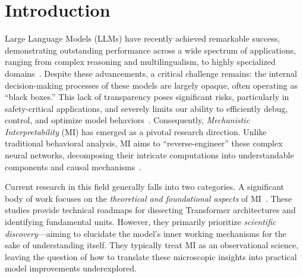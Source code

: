 \documentclass[11pt,letterpaper]{mystyle}
\begin{document}
\section{Introduction}
\label{sec:intro}
Large Language Models (LLMs) have recently achieved remarkable success, demonstrating outstanding performance across a wide spectrum of applications, ranging from complex reasoning and multilingualism, to highly specialized domains~\citep{li2025system,ren2025deepseek,dubey2024llama,openai2024gpt4technicalreport,liang2025sws,qin2025survey,yang2024llm,chang2025treereview,li2024survey,zhao2024revolutionizing,yu-etal-2025-chain,qwen2025qwen25technicalreport}.
Despite these advancements, a critical challenge remains: the internal decision-making processes of these models are largely opaque, often operating as ``black boxes.''
This lack of transparency poses significant risks, particularly in safety-critical applications, and severely limits our ability to efficiently debug, control, and optimize model behaviors~\citep{huang2024exploring,hong2024cyclealign,zhang2025black}.
Consequently, \textit{Mechanistic Interpretability} (MI) has emerged as a pivotal research direction. 
Unlike traditional behavioral analysis, MI aims to ``reverse-engineer'' these complex neural networks, decomposing their intricate computations into understandable components and causal mechanisms~\citep{ferrando2024primer,zhao2024explainability,geiger2025causal}.

Current research in this field generally falls into two categories.
A significant body of work focuses on the \textit{theoretical and foundational aspects} of MI~\citep{rauker2023toward,allen2023physics,ferrando2024primer,zhao2024explainability,zheng2024attention,saphra2024mechanistic,lopez2025linguistic,geiger2025causal,gantla2025exploring}. These studies provide technical roadmaps for dissecting Transformer architectures and identifying fundamental units. 
However, they primarily prioritize \textit{scientific discovery}---aiming to elucidate the model's inner working mechanisms for the sake of understanding itself. They typically treat MI as an observational science, leaving the question of how to translate these microscopic insights into practical model improvements underexplored.
\end{document}

